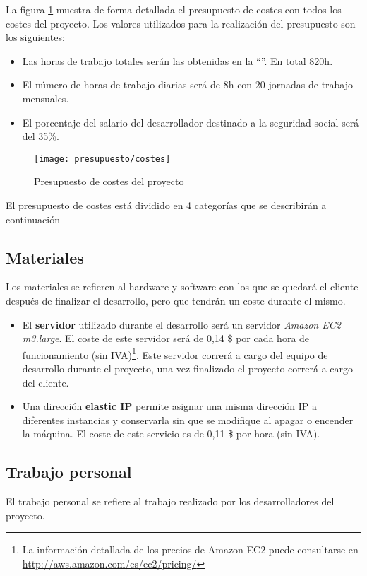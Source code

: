 La figura \ref{fig:presupuesto_costes} muestra de forma detallada el presupuesto de costes con todos los costes del proyecto.  Los valores utilizados para la realización del presupuesto son los siguientes:
\begin{itemize}
	\item Las horas de trabajo totales serán las obtenidas en la ``''. En total 820h.
	\item El número de horas de trabajo diarias será de 8h con 20 jornadas de trabajo mensuales.
	\item El porcentaje del salario del desarrollador destinado a la seguridad social será del 35\%.
\end{itemize}


	\begin{figure}[h]
		\centering
		\texttt{[image: presupuesto/costes]}
		\caption{Presupuesto de costes del proyecto}
		\label{fig:presupuesto_costes}
	\end{figure}

El presupuesto de costes está dividido en 4 categorías que se describirán a continuación

\subsection{Materiales}
	Los materiales se refieren al hardware y software con los que se quedará el cliente después de finalizar el desarrollo, pero que tendrán un coste durante el mismo.
	\begin{itemize}
		\item El \textbf{servidor} utilizado durante el desarrollo será un servidor \textit{Amazon EC2 m3.large}. El coste de este servidor será de 0,14 \$ por cada hora de funcionamiento (sin IVA)\footnote{La información detallada de los precios de Amazon EC2 puede consultarse en \url{http://aws.amazon.com/es/ec2/pricing/}}.  Este servidor correrá a cargo del equipo de desarrollo durante el proyecto, una vez finalizado el proyecto correrá a cargo del cliente.
		\item Una dirección \textbf{elastic IP} permite asignar una misma dirección IP a diferentes instancias y conservarla sin que se modifique al apagar o encender la máquina.  El coste de este servicio es de 0,11 \$ por hora (sin IVA).
	\end{itemize}

\subsection{Trabajo personal}
	El trabajo personal se refiere al trabajo realizado por los desarrolladores del proyecto.
	

